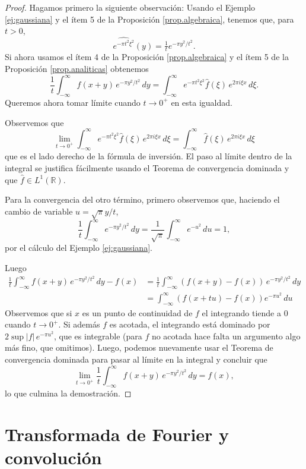 \documentclass[12pt, a4paper]{amsbook}
\newcommand{\R}{{\mathbb R}}
\theoremstyle{remark}
\theoremstyle{definition}
\numberwithin{section}{chapter}
\numberwithin{subsection}{section}
\numberwithin{equation}{section}
\numberwithin{figure}{chapter}
\begin{document}
\begin{proof}
Hagamos primero la siguiente observación: Usando el Ejemplo \ref{ej:gaussiana} y el ítem 5 de la Proposición \ref{prop.algebraica}, tenemos que, para $t>0$,
\begin{equation}\label{gaussiana}
\widehat{e^{-\pi t^2\xi^2}}(y) = \tfrac{1}{t}e^{-\pi y^2/t^2}.
\end{equation}
Si ahora usamos el ítem 4 de la Proposición \ref{prop.algebraica} y el ítem 5 de la Proposición \ref{prop.analiticas} obtenemos
$$
\frac{1}{t} \int_{-\infty}^\infty f(x+y)\, e^{-\pi y^2/t^2}\, dy = \int_{-\infty}^\infty e^{-\pi t^2\xi^2} \hat f(\xi)\, e^{2\pi i\xi x}\, d\xi.
$$
Queremos ahora tomar límite cuando $t\to 0^+$ en esta igualdad.

Observemos que
$$
\lim_{t\to 0^+}\int_{-\infty}^\infty e^{-\pi t^2\xi^2} \hat f(\xi)\, e^{2\pi i\xi x}\, d\xi =  \int_{-\infty}^\infty \hat f(\xi)\, e^{2\pi i \xi x}\, d\xi
$$
que es el lado derecho de la fórmula de inversión. El paso al límite dentro de la integral se justifica fácilmente usando el Teorema de convergencia dominada y que $\hat f\in L^1(\R)$.

Para la convergencia del otro término, primero observemos que, haciendo el cambio de variable $u=\sqrt{\pi}y/t$,
$$
\frac{1}{t}\int_{-\infty}^\infty e^{-\pi y^2/t^2}\, dy = \frac{1}{\sqrt{\pi}}\int_{-\infty}^\infty e^{-u^2}\, du =1,
$$
por el cálculo del Ejemplo \ref{ej:gaussiana}.

Luego
\begin{align*}
\frac{1}{t} \int_{-\infty}^\infty f(x+y)\, e^{-\pi y^2/t^2}\, dy - f(x) &= \frac{1}{t} \int_{-\infty}^\infty (f(x+y)- f(x))\, e^{-\pi y^2/t^2}\, dy\\
&= \int_{-\infty}^\infty (f(x+tu)-f(x)) e^{-\pi u^2}\, du
\end{align*}
Observemos que si $x$ es un punto de continuidad de $f$ el integrando tiende a 0 cuando $t\to 0^+$. Si además $f$ es acotada, el integrando está dominado por $2\sup|f|\,e^{-\pi u^2}$, que es integrable (para $f$ no acotada hace falta un argumento algo más fino, que omitimos). Luego, podemos nuevamente usar el Teorema de convergencia dominada para pasar al límite en la integral y concluir que
$$
\lim_{t\to 0^+}\frac{1}{t} \int_{-\infty}^\infty f(x+y)\, e^{-\pi y^2/t^2}\, dy = f(x),
$$
lo que culmina la demostración.
\end{proof}

\section{Transformada de Fourier y convolución}
\end{document}
